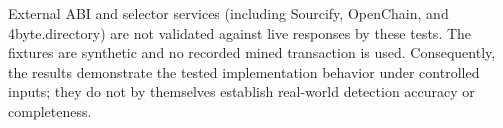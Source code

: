 \documentclass[10pt,a4paper]{article}
\begin{document}
External ABI and selector services (including Sourcify, OpenChain, and 4byte.directory) are not validated against live responses by these tests. The fixtures are synthetic and no recorded mined transaction is used. Consequently, the results demonstrate the tested implementation behavior under controlled inputs; they do not by themselves establish real-world detection accuracy or completeness.
\end{document}
